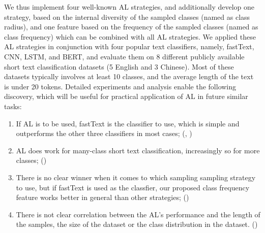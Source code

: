 We thus implement four well-known AL strategies, and additionally develop one strategy, based on the internal diversity of the sampled classes
(named as class radius), and one feature based on the frequency of
the sampled classes (named as class frequency) which can be combined with all AL strategies. 
We applied these AL strategies in conjunction with
four popular text classifiers, namely, fastText, CNN, 
LSTM, and BERT, and evaluate them on 8 different publicly
available short text classification datasets (5 English and 3 Chinese). 
Most of these datasets typically involves at least 10 classes, 
and the average length of the text is under 20 tokens. Detailed experiments
and analysis enable the following discovery, which will be useful for
practical application of AL in future similar tasks:

\begin{enumerate}
\item If AL is to be used, fastText is the classifier to use, which is simple
and outperforms the other three classifiers in most cases; (, )

\item AL does work for many-class short text classification, increasingly so
for more classes; ()
\item There is no clear winner when it comes to which sampling sampling
strategy to use, but if fastText is used as the classfier, our proposed
class frequency feature works better in general than other strategies; ()
\item There is not clear correlation between the AL's performance and the
length of the samples, the size of the dataset or the class distribution
in the dataset. ()
\end{enumerate}

